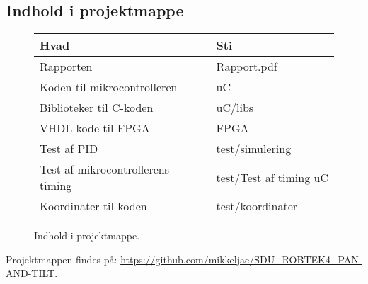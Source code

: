 \newpage

\tableofcontents

\subsection*{Indhold i projektmappe}
\begin{figure}[th!]
\centering
\begin{tabular}{l|l}
Hvad&Sti\\\hline
Rapporten&Rapport.pdf\\
Koden til mikrocontrolleren &uC\\
Biblioteker til C-koden&uC/libs\\
VHDL kode til FPGA &FPGA\\
Test af PID &test/simulering\\
Test af mikrocontrollerens timing&test/Test af timing uC\\
Koordinater til koden &test/koordinater\\

\end{tabular}
\captionsetup{type=table, width=0.6\textwidth}
\caption*{Indhold i projektmappe. \label{tb:CD}}
\end{figure}

Projektmappen findes på:  \url{https://github.com/mikkeljae/SDU_ROBTEK4_PAN-AND-TILT}.
\clearpage
\listoffigures
\listoftables  

 \listoftodos